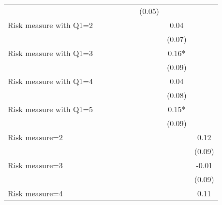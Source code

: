 \begin{table}[htbp]
\begin{threeparttable}
\begin{tabular}{l cccccccc}
                    &               &               &               &               &               &      (0.05)   &               &               \\
Risk measure with Q1=2&               &               &               &               &               &               &        0.04   &               \\
                    &               &               &               &               &               &               &      (0.07)   &               \\
Risk measure with Q1=3&               &               &               &               &               &               &        0.16*  &               \\
                    &               &               &               &               &               &               &      (0.09)   &               \\
Risk measure with Q1=4&               &               &               &               &               &               &        0.04   &               \\
                    &               &               &               &               &               &               &      (0.08)   &               \\
Risk measure with Q1=5&               &               &               &               &               &               &        0.15*  &               \\
                    &               &               &               &               &               &               &      (0.09)   &               \\
Risk measure=2      &               &               &               &               &               &               &               &        0.12   \\
                    &               &               &               &               &               &               &               &      (0.09)   \\
Risk measure=3      &               &               &               &               &               &               &               &       -0.01   \\
                    &               &               &               &               &               &               &               &      (0.09)   \\
Risk measure=4      &               &               &               &               &               &               &               &        0.11   \\

\end{tabular}
\end{threeparttable}
\end{table}
